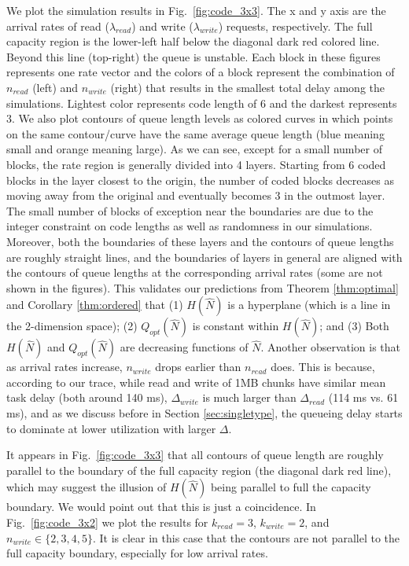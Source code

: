 \documentclass[journal]{IEEEtran}
\newcommand{\codeVec}{\hat{N}}
\begin{document}
 We plot the simulation results in Fig.~\ref{fig:code_3x3}. The x and y axis are the arrival rates of read ($\lambda_{read}$) and write ($\lambda_{write}$)  requests, respectively. The full capacity region is the lower-left half below the diagonal dark red colored line. Beyond this line (top-right) the queue is unstable. Each block in these figures represents one rate vector and the colors of a block represent the combination of $n_{read}$ (left) and $n_{write}$ (right) that results in the smallest total delay among the simulations. Lightest color represents code length of 6 and the darkest represents 3. We also plot contours of queue length levels as colored curves in which points on the same contour/curve have the same average queue length (blue meaning small and orange meaning large).  As we can see, except for a small number of blocks, the rate region is generally divided into 4 layers. Starting from 6 coded blocks in the layer closest to the origin, the number of coded blocks decreases as moving away from the original and eventually becomes 3 in the outmost layer. The small number of blocks of exception near the boundaries are due to the integer constraint on code lengths as well as  randomness in our simulations. Moreover, both the boundaries of these layers and the contours of queue lengths are roughly straight lines, and the boundaries of layers in general are aligned  with the contours of queue lengths at the corresponding arrival rates (some are not shown in the figures). This validates our predictions from Theorem \ref{thm:optimal} and Corollary \ref{thm:ordered} that (1) $H(\codeVec)$ is a hyperplane (which is a line in the 2-dimension space); (2) $Q_{opt}(\codeVec)$ is constant within $H(\codeVec)$; and (3) Both $H(\codeVec)$ and $Q_{opt}(\codeVec)$ are decreasing functions of $\codeVec$. 
Another observation is that as arrival rates increase, $n_{write}$ drops earlier than $n_{read}$ does. This is because, according to our trace, while read and write of 1MB chunks have similar mean task delay (both around 140 ms), $\Delta_{write}$ is much larger than $\Delta_{read}$ (114 ms vs. 61 ms), and as we discuss before in Section \ref{sec:singletype}, the queueing delay starts to dominate at lower utilization with larger $\Delta$. 

It appears in Fig.~\ref{fig:code_3x3} that all contours of queue length are roughly parallel to the boundary of the full capacity region (the diagonal dark red line), which may suggest the illusion of $H(\codeVec)$ being parallel to full the capacity boundary. We would  point out that this is just a coincidence. In Fig.~\ref{fig:code_3x2} we plot the results for $k_{read}=3$, $k_{write}=2$, and $n_{write}\in\{2,3,4,5\}$. It is clear in this case that the contours are not parallel to the full capacity boundary, especially for low arrival rates. 
\end{document}
